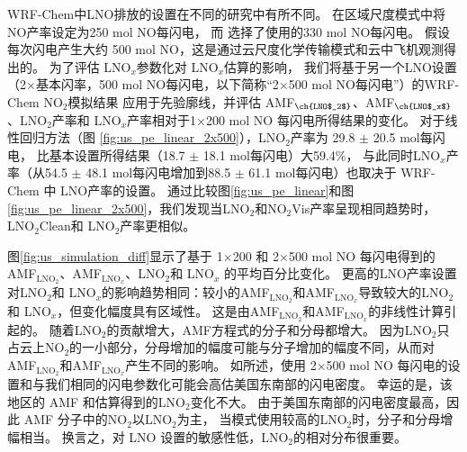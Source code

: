 WRF-Chem中LNO排放的设置在不同的研究中有所不同。
\citet{Zhao.2009}在区域尺度模式中将NO产率设定为250 mol NO每闪电，
而 \citet{Bela.2016}选择了\citet{Barth.2012}使用的330 mol NO每闪电。
\citet{Wang.2015a}假设每次闪电产生大约 500 mol NO，这是通过云尺度化学传输模式和云中飞机观测得出的\citep{Ott.2010}。
为了评估 LNO$_x$参数化对 LNO$_x$估算的影响，
我们将基于另一个LNO设置（2$\times$基本闪率，500 mol NO每闪电，以下简称“2$\times$500 mol NO每闪电”）的WRF-Chem NO$_2$模拟结果
应用于先验廓线，并评估 AMF$_{\ch{LNO$_2$}}$、AMF$_{\ch{LNO$_x$}}$、LNO$_2$产率和 LNO$_x$产率相对于1$\times$200 mol NO 每闪电所得结果的变化。
对于线性回归方法（图 \ref{fig:us_pe_linear_2x500}），LNO$_2$产率为 29.8 $\pm$ 20.5 mol每闪电，
比基本设置所得结果（18.7 $\pm$ 18.1 mol每闪电）大59.4\%，
与此同时LNO$_x$产率（从54.5 $\pm$ 48.1 mol每闪电增加到88.5 $\pm$ 61.1 mol每闪电）也取决于 WRF-Chem 中 LNO产率的设置。
通过比较图\ref{fig:us_pe_linear}和图\ref{fig:us_pe_linear_2x500}，我们发现当LNO$_2$和NO$_2$Vis产率呈现相同趋势时，
LNO$_2$Clean和 LNO$_2$产率更相似。


图\ref{fig:us_simulation_diff}显示了基于 1$\times$200 和 2$\times$500 mol NO 每闪电得到的AMF$_\textrm{LNO$_2$}$、AMF$_\textrm{LNO$_x$}$、LNO$_2$和 LNO$_x$ 的平均百分比变化。
更高的LNO产率设置对LNO$_2$和 LNO$_x$的影响趋势相同：较小的AMF$_\textrm{LNO$_2$}$和AMF$_\textrm{LNO$_x$}$导致较大的LNO$_2$和 LNO$_x$，但变化幅度具有区域性。
这是由AMF$_\textrm{LNO$_2$}$和AMF$_\textrm{LNO$_x$}$的非线性计算引起的。
随着LNO$_2$的贡献增大，AMF方程式的分子和分母都增大。
因为LNO$_2$只占云上NO$_2$的一小部分，分母增加的幅度可能与分子增加的幅度不同，从而对AMF$_\textrm{LNO$_2$}$和AMF$_\textrm{LNO$_x$}$产生不同的影响。
如\citet{Zhu.2019}所述，使用 2$\times$500 mol NO 每闪电的设置和与我们相同的闪电参数化可能会高估美国东南部的闪电密度。
幸运的是，该地区的 AMF 和估算得到的LNO$_2$变化不大。
由于美国东南部的闪电密度最高，因此 AMF 分子中的NO$_2$以LNO$_2$为主，
当模式使用较高的LNO$_2$时，分子和分母增幅相当。
换言之，对 LNO 设置的敏感性低，LNO$_2$的相对分布很重要。



